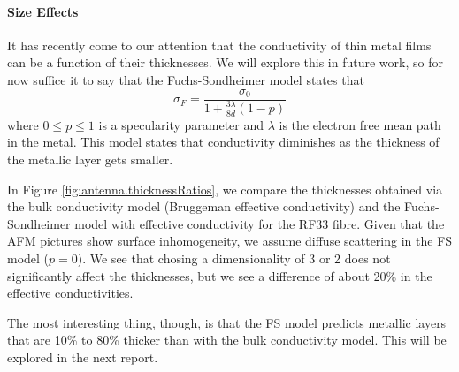 \paragraph*{Size Effects}
It has recently come to our attention that the conductivity 
of thin metal films can be a function of their thicknesses. 
We will explore this in future work, so for now 
suffice it to say that the Fuchs-Sondheimer model states
that
  \begin{equation}
      \sigma_F = \frac{\sigma_0}{1+\frac{3\lambda}{8d}\left(1-p\right)}
  \end{equation}
where $0\leq p\leq1$ is a specularity parameter and $\lambda$ is the 
electron free mean path in the metal. This model states that conductivity
diminishes as the thickness of the metallic layer gets smaller.


In Figure \ref{fig:antenna.thicknessRatios}, we compare the 
thicknesses obtained via the bulk conductivity model (Bruggeman 
effective conductivity) and the Fuchs-Sondheimer model with 
effective conductivity for the RF33 fibre. Given that the AFM pictures
show surface inhomogeneity, we assume diffuse scattering in 
the FS model ($p=0$). We see that chosing a dimensionality 
of 3 or 2 does not significantly affect the thicknesses, but
we see a difference of about 20\% in the effective conductivities.

The most interesting thing, though, is that the FS
model predicts metallic layers that are 10\% to 80\% thicker 
than with the bulk conductivity model. This will be explored 
in the next report. 

